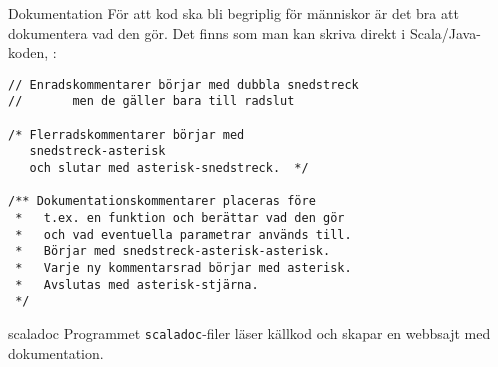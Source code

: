 \begin{Slide}{Dokumentation}\footnotesize
För att kod ska bli begriplig för människor är det bra att dokumentera vad den gör. Det finns  som man kan skriva direkt i Scala/Java-koden, :
\begin{lstlisting}
// Enradskommentarer börjar med dubbla snedstreck
//       men de gäller bara till radslut

/* Flerradskommentarer börjar med
   snedstreck-asterisk
   och slutar med asterisk-snedstreck.  */

/** Dokumentationskommentarer placeras före
 *   t.ex. en funktion och berättar vad den gör
 *   och vad eventuella parametrar används till.
 *   Börjar med snedstreck-asterisk-asterisk.
 *   Varje ny kommentarsrad börjar med asterisk.
 *   Avslutas med asterisk-stjärna.
 */
\end{lstlisting}
\end{Slide}

\begin{Slide}{scaladoc}
Programmet \texttt{scaladoc}-filer läser källkod och skapar en webbsajt med dokumentation.

\vspace{2em}
\end{Slide}


\ifkompendium\else

